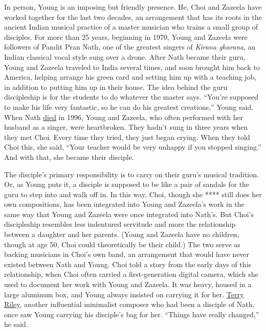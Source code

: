 In person, Young is an imposing but friendly presence. He, Choi and
Zazeela have worked together for the last two decades, an arrangement
that has its roots in the ancient Indian musical practice of a master
musician who trains a small group of disciples. For more than 25 years,
beginning in 1970, Young and Zazeela were followers of Pandit Pran Nath,
one of the greatest singers of \emph{Kirana gharana}, an Indian
classical vocal style sung over a drone. After Nath became their guru,
Young and Zazeela traveled to India several times, and soon brought him
back to America, helping arrange his green card and setting him up with
a teaching job, in addition to putting him up in their house. The idea
behind the guru discipleship is for the students to do whatever the
master says. ``You're supposed to make his life very fantastic, so he
can do his greatest creations,'' Young said. When Nath
\href{https://www.nytimes3xbfgragh.onion/1996/06/17/arts/pandit-pran-nath-77-singer-in-classical-hindustani-style.html}{died}
in 1996, Young and Zazeela, who often performed with her husband as a
singer, were heartbroken. They hadn't sung in three years when they met
Choi. Every time they tried, they just began crying. When they told Choi
this, she said, ``Your teacher would be very unhappy if you stopped
singing.'' And with that, she became their disciple.

The disciple's primary responsibility is to carry on their guru's
musical tradition. Or, as Young puts it, a disciple is supposed to be
like a pair of sandals for the guru to step into and walk off in. In
this way, Choi, though she **** still does her own compositions, has
been integrated into Young and Zazeela's work in the same way that Young
and Zazeela were once integrated into Nath's. But Choi's discipleship
resembles less indentured servitude and more the relationship between a
daughter and her parents. (Young and Zazeela have no children, though at
age 50, Choi could theoretically be their child.) The two serve as
backing musicians in Choi's own band, an arrangement that would have
never existed between Nath and Young. Choi told a story from the early
days of this relationship, when Choi often carried a first-generation
digital camera, which she used to document her work with Young and
Zazeela. It was heavy, housed in a large aluminum box, and Young always
insisted on carrying it for her.
\href{https://www.nytimes3xbfgragh.onion/2019/12/19/arts/music/terry-riley.html}{Terry
Riley}, another influential minimalist composer who had been a disciple
of Nath, once saw Young carrying his disciple's bag for her. ``Things
have really changed,'' he said.

